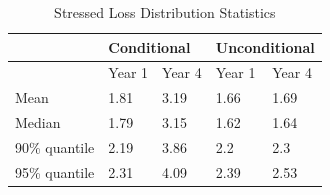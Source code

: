 \documentclass[a4j,12pt]{jarticle}
\begin{document}
\begin{table}[H]
\centering
\caption{Stressed Loss Distribution Statistics}
\begin{tabular}{|l|l|l|l|l|}
\hline
              & \multicolumn{2}{l|}{Conditional} & \multicolumn{2}{l|}{Unconditional} \\ \hline
              & Year 1          & Year 4         & Year 1           & Year 4          \\ \hline
Mean          & 1.81            & 3.19           & 1.66             & 1.69            \\ \hline
Median        & 1.79            & 3.15           & 1.62             & 1.64            \\ \hline
90\% quantile & 2.19            & 3.86           & 2.2              & 2.3             \\ \hline
95\% quantile & 2.31            & 4.09           & 2.39             & 2.53            \\ \hline
\end{tabular}
\end{table}
\end{document}
